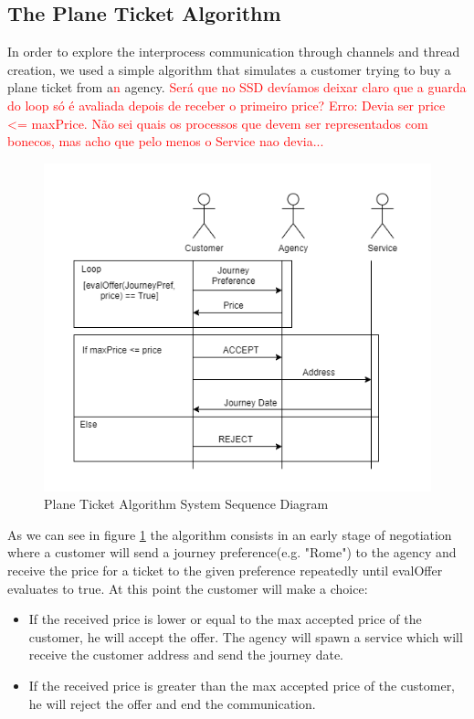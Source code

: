 \documentclass[runningheads]{llncs}
\begin{document}
\subsection{The Plane Ticket Algorithm}
In order to explore the interprocess communication through channels and thread creation, we used a simple algorithm that simulates a customer trying to buy a plane ticket from a\textcolor{red}{n} agency.
\textcolor{red}{Será que no SSD devíamos deixar claro que a guarda do loop só é avaliada depois de receber o primeiro price?}
\textcolor{red}{Erro: Devia ser price \textless = maxPrice.}
\textcolor{red}{Não sei quais os processos que devem ser representados com bonecos, mas acho que pelo menos o Service nao devia...}
\begin{figure}[H]
\centering
\includegraphics[scale=0.4]{Algorithm.png}
\caption{Plane Ticket Algorithm System Sequence Diagram}
\label{ssd}
\end{figure}
As we can see in figure \ref{ssd} the algorithm consists in an early stage of negotiation where a customer will send a journey preference(e.g. "Rome") to the agency and receive the price for a ticket to the given preference repeatedly until evalOffer evaluates to true.
At this point the customer will make a choice:
\begin{itemize}
\item If the received price is lower or equal to the max accepted price of the customer, he will accept the offer.
The agency will spawn a service which will receive the customer address and send the journey date.
\item If the received price is greater than the max accepted price of the customer, he will reject the offer and end the communication.
\end{itemize}
\end{document}
